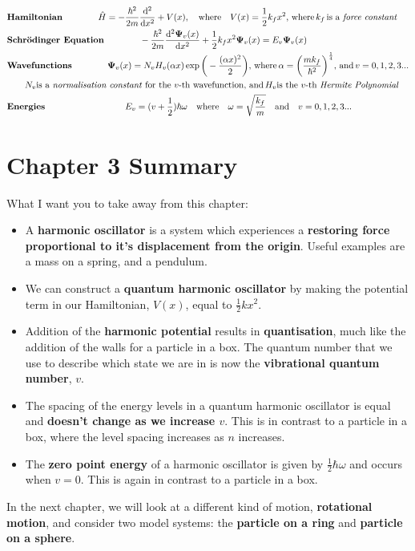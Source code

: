 \documentclass{memoir}[11pt,oneside,a4paper,openany]
\newenvironment{myblock}[1]{%
    \tcolorbox[beamer,%
    noparskip,breakable,
    colback=LightBlue,colframe=DarkBlue,%
    colbacklower=DarkBlue!75!LightBlue,%
    title=#1]}%
    {\endtcolorbox}
\newcommand{\wf}{\ensuremath{\bm{\Psi}}\xspace}
\newcommand{\dd}{\ensuremath{\mathrm{d}}}
\begin{document}
\begin{myblock}{\begin{center}Particle in Harmonic Potential\end{center}}
	\begin{center}
		\begin{align*} & \text{\textbf{Hamiltonian}} \qquad\qquad \hat{H} = -\frac{\hbar^2}{2m}\frac{\dd^2}{\dd x^2} + V(x),\quad  \text{where} \quad V(x) = \frac{1}{2}k_fx^2, \,\text{where}\,k_f\,\text{is a \emph{force constant}} \\
			& \text{\textbf{Schr{\"o}dinger Equation}} \qquad\qquad -\frac{\hbar^2}{2m}\frac{\dd^2\wf_v(x)}{\dd x^2} + \frac{1}{2}k_fx^2\wf_v(x) = E_v \wf_v(x) \\
			& \text{\textbf{Wavefunctions}} \qquad\qquad \wf_v(x) = N_vH_v(\alpha x)\exp{\bigg(-\frac{(\alpha x)^2}{2}\bigg)}, \,\text{where} \,\alpha = \bigg(\frac{mk_f}{\hbar^2}\bigg)^{\frac{1}{4}},\,\text{and}\, v=0,1,2,3...\\
			& \qquad N_v \text{is a \emph{normalisation constant} for the $v$-th wavefunction, and}\, H_v \text{is the $v$-th \emph{Hermite Polynomial}} \\
			& \text{\textbf{Energies}} \qquad\qquad\qquad\qquad\quad E_v = (v+\frac{1}{2})\hbar\omega \quad \text{where} \quad \omega = \sqrt{\frac{k_f}{m}} \quad \text{and} \quad v=0,1,2,3...
	\end{align*}
	\end{center}
\end{myblock}

\section{Chapter 3 Summary}
What I want you to take away from this chapter:
\begin{itemize}
	\item A \textbf{harmonic oscillator} is a system which experiences a \textbf{restoring force proportional to it's displacement from the origin}. Useful examples are a mass on a spring, and a pendulum.
	\item We can construct a \textbf{quantum harmonic oscillator} by making the potential term in our Hamiltonian, $V(x)$, equal to $\frac{1}{2}kx^2$.
	\item Addition of the \textbf{harmonic potential} results in \textbf{quantisation}, much like the addition of the walls for a particle in a box. The quantum number that we use to describe which state we are in is now the \textbf{vibrational quantum number}, $v$.
	\item The spacing of the energy levels in a quantum harmonic oscillator is equal and \textbf{doesn't change as we increase $v$}. This is in contrast to a particle in a box, where the level spacing increases as $n$ increases.
	\item The \textbf{zero point energy} of a harmonic oscillator is given by $\frac{1}{2}\hbar\omega$ and occurs when $v=0$. This is again in contrast to a particle in a box.
\end{itemize}
In the next chapter, we will look at a different kind of motion, \textbf{rotational motion}, and consider two model systems: the \textbf{particle on a ring} and \textbf{particle on a sphere}.
\end{document}
